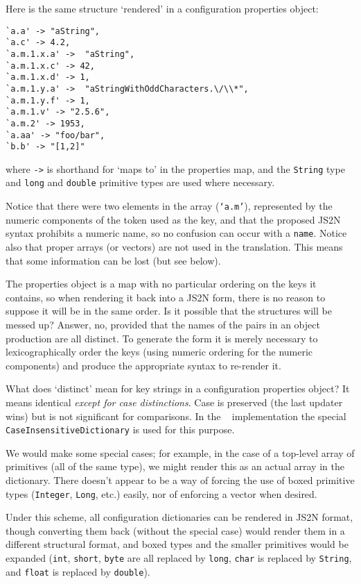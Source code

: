 \documentclass[a4paper,twoside,12pt]{article}
\begin{document}
Here is the same structure `rendered' in a configuration properties object:
\begin{verbatim}
`a.a' -> "aString", 
`a.c' -> 4.2,
`a.m.1.x.a' ->  "aString",
`a.m.1.x.c' -> 42,
`a.m.1.x.d' -> 1,
`a.m.1.y.a' ->  "aStringWithOddCharacters.\/\\*",
`a.m.1.y.f' -> 1,
`a.m.1.v' -> "2.5.6",
`a.m.2' -> 1953,
`a.aa' -> "foo/bar",
`b.b' -> "[1,2]"
\end{verbatim}
where \texttt{->} is shorthand for `maps to' in the properties map, and the \texttt{String} type and \texttt{long} and \texttt{double} primitive types are used where necessary.

Notice that there were two elements in the array (\texttt{`a.m'}), represented by the numeric components of the token used as the key, and that the proposed JS2N syntax prohibits a numeric name, so no confusion can occur with a \texttt{name}. Notice also that proper arrays (or vectors) are not used in the translation. This means that some information can be lost (but see below).

The properties object is a map with no particular ordering on the keys it contains, so when rendering it back into a JS2N form, there is no reason to suppose it will be in the same order. Is it possible that the structures will be messed up? Answer, no, provided that the names of the pairs in an object production are all distinct. To generate the form it is merely necessary to lexicographically order the keys (using numeric ordering for the numeric components) and produce the appropriate syntax to re-render it.

What does `distinct' mean for key strings in a configuration properties object? It means identical \emph{except for case distinctions}. Case is preserved (the last updater wins) but is not significant for comparisons. In the \felix~ implementation the special \texttt{CaseInsensitiveDictionary} is used for this purpose.

We would make some special cases; for example, in the case of a top-level array of primitives (all of the same type), we might render this as an actual array in the dictionary. There doesn't appear to be a way of forcing the use of boxed primitive types (\texttt{Integer}, \texttt{Long}, etc.) easily, nor of enforcing a vector when desired.

Under this scheme, all configuration dictionaries can be rendered in JS2N format, though converting them back (without the special case) would render them in a different structural format, and boxed types and the smaller primitives would be expanded (\texttt{int}, \texttt{short}, \texttt{byte} are all replaced by \texttt{long}, \texttt{char} is replaced by \texttt{String}, and \texttt{float} is replaced by \texttt{double}).
\end{document}
